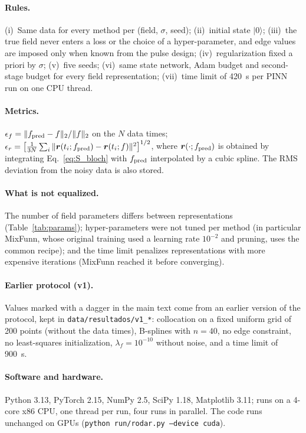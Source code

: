 \documentclass[aps,pra,onecolumn,superscriptaddress,11pt,longbibliography,floatfix,nofootinbib]{revtex4-2}
\newcommand{\rvec}{\bm r}
\newcommand{\ef}{\epsilon_f}
\newcommand{\er}{\epsilon_r}
\begin{document}
\paragraph{Rules.} (i)~Same data for every method per (field, $\sigma$, seed); (ii)~initial state
$|0\rangle$; (iii)~the true field never enters a loss or the choice of a hyper-parameter, and edge values
are imposed only when known from the pulse design; (iv)~regularization fixed a priori by $\sigma$;
(v)~five seeds; (vi)~same state network, Adam budget and second-stage budget for every field
representation; (vii)~time limit of 420~s per PINN run on one CPU thread.

\paragraph{Metrics.} $\ef=\|f_{\rm pred}-f\|_2/\|f\|_2$ on the $N$ data times;
$\er=\big[\tfrac1{3N}\sum_i\|\rvec(t_i;f_{\rm pred})-\rvec(t_i;f)\|^2\big]^{1/2}$, where
$\rvec(\cdot;f_{\rm pred})$ is obtained by integrating Eq.~\eqref{eq:S_bloch} with $f_{\rm pred}$
interpolated by a cubic spline. The RMS deviation from the noisy data is also stored.

\paragraph{What is not equalized.} The number of field parameters differs between representations
(Table~\ref{tab:params}); hyper-parameters were not tuned per method (in particular MixFunn, whose
original training used a learning rate $10^{-2}$ and pruning, uses the common recipe); and the time limit
penalizes representations with more expensive iterations (MixFunn reached it before converging).

\paragraph{Earlier protocol (v1).} Values marked with a dagger in the main text come from an earlier
version of the protocol, kept in \texttt{data/resultados/v1\_*}: collocation on a fixed uniform grid of
200 points (without the data times), B-splines with $n=40$, no edge constraint, no least-squares
initialization, $\lambda_f=10^{-10}$ without noise, and a time limit of 900~s.

\paragraph{Software and hardware.} Python 3.13, PyTorch 2.15, NumPy 2.5, SciPy 1.18, Matplotlib 3.11;
runs on a 4-core x86 CPU, one thread per run, four runs in parallel. The code runs unchanged on GPUs
(\texttt{python run/rodar.py --device cuda}).
\end{document}
